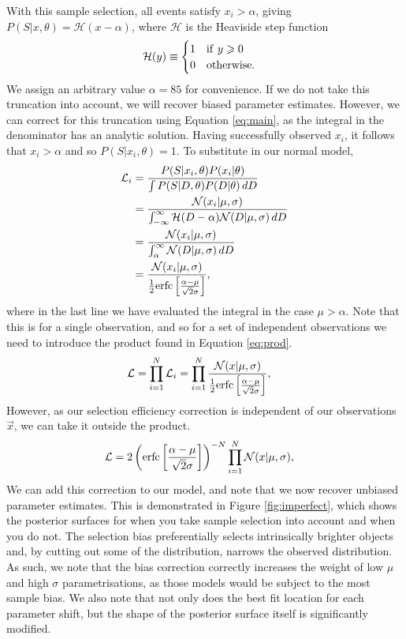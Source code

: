 \documentclass[a4paper,fleqn,usenatbib]{mnras}
\begin{document}
With this sample selection, all events satisfy $x_i > \alpha$, giving $P(S|x,\theta) = \mathcal{H}(x - \alpha)$, where $\mathcal{H}$ is the Heaviside step function
\begin{align}
\mathcal{H}(y)\equiv \begin{cases}
1 \quad {\rm if }\  y \ge 0 \\
0 \quad {\rm otherwise.}
\end{cases}
\end{align} 
We assign an arbitrary value $\alpha=85$ for convenience. If we do not take this truncation into account, we will recover biased parameter estimates. However, we can correct for this truncation using Equation \eqref{eq:main}, as the integral in the denominator has an analytic solution. Having successfully observed $x_i$, it follows that $x_i > \alpha$ and so $P(S|x_i,\theta) = 1$. To substitute in our normal model,
\begin{align}
\mathcal{L}_i &= \frac{P(S|x_i,\theta) P(x_i|\theta)}{\int P(S | D, \theta) P(D|\theta)\, dD} \\
&= \frac{ \mathcal{N}(x_i|\mu, \sigma)}{\int_{-\infty}^\infty \mathcal{H}(D - \alpha) \mathcal{N}(D|\mu, \sigma)\, dD} \\
&= \frac{ \mathcal{N}(x_i|\mu, \sigma)}{\int_{\alpha}^\infty \mathcal{N}(D|\mu, \sigma)\, dD} \\
&= \frac{ \mathcal{N}(x_i|\mu, \sigma)}{\frac{1}{2} {\rm erfc}\left[ \frac{\alpha - \mu}{\sqrt{2}\sigma} \right]}, 
\end{align}
where in the last line we have evaluated the integral in the case $\mu > \alpha$. Note that this is for a single observation, and so for a set of independent observations we need to introduce the product found in Equation \eqref{eq:prod}. 
\begin{align}
\mathcal{L} &= \prod_{i=1}^N \mathcal{L}_i =  \prod_{i=1}^N \frac{ \mathcal{N}(x|\mu, \sigma)}{\frac{1}{2} {\rm erfc}\left[ \frac{\alpha - \mu}{\sqrt{2}\sigma} \right]}, 
\end{align}
However, as our selection efficiency correction is independent of our observations $\vec{x}$, we can take it outside the product.
\begin{align}
\mathcal{L} &= 2 \left( {\rm erfc}\left[ \frac{\alpha - \mu}{\sqrt{2}\sigma} \right] \right)^{-N}\prod_{i=1}^N  \mathcal{N}(x|\mu, \sigma),
\end{align}
We can add this correction to our model, and note that we now recover unbiased parameter estimates. This is demonstrated in Figure \ref{fig:imperfect}, which shows the posterior surfaces for when you take sample selection into account and when you do not. The selection bias preferentially selects intrinsically brighter objects and, by cutting out some of the distribution, narrows the observed distribution. As such, we note that the bias correction correctly increases the weight of low $\mu$ and high $\sigma$ parametrisations, as those models would be subject to the most sample bias. We also note that not only does the best fit location for each parameter shift, but the shape of the posterior surface itself is significantly modified.
\end{document}
